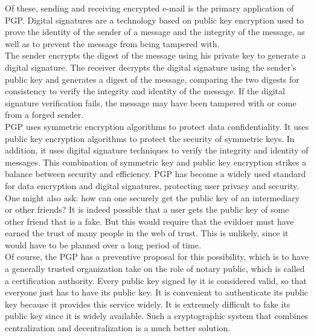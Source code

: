 Of these, sending and receiving encrypted e-mail is the primary 
application of PGP.\cite{b7} Digital signatures are a technology based on 
public key encryption used to prove the identity of the sender 
of a message and the integrity of the message, as well as to 
prevent the message from being tampered with.
\\
The sender encrypts the digest of the message using his 
private key to generate a digital signature. The receiver 
decrypts the digital signature using the sender's public 
key and generates a digest of the message, comparing the 
two digests for consistency to verify the integrity and 
identity of the message. If the digital signature verification 
fails, the message may have been tampered with or come from a 
forged sender.\cite{b7}
\\
PGP uses symmetric encryption algorithms to protect data 
confidentiality. It uses public key encryption algorithms to protect 
the security of symmetric keys. In addition, it uses digital signature 
techniques to verify the integrity and identity of messages. 
This combination of symmetric key and public key encryption 
strikes a balance between security and efficiency. PGP has become 
a widely used standard for data encryption and digital signatures, 
protecting user privacy and security\cite{b7, b9, b36}.
\\
One might also ask: how can one securely get the public key of an intermediary or other 
friends? It is indeed possible that a user gets the public key of some other friend that 
is a fake. But this would require that the evildoer must have earned the trust of many 
people in the web of trust. This is unlikely, since it would have to be planned over a 
long period of time.
\\
Of course, the PGP has a preventive proposal for this possibility, which is to have a 
generally trusted organization take on the role of notary public, which is called a 
certification authority. Every public key signed by it is considered valid, so that everyone 
just has to have its public key. It is convenient to authenticate its public key because 
it provides this service widely. It is extremely difficult to fake its public key since 
it is widely available.\cite{b8, b10} Such a cryptographic system that combines centralization and 
decentralization is a much better solution.

